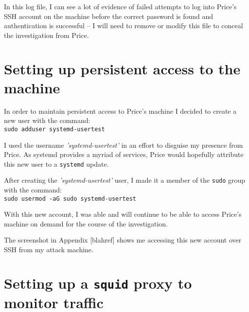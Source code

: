 \documentclass[12pt]{report}
\newcommand{\term}[1]{\colorbox{light-gray}{\texttt{#1}}}
\begin{document}
In this log file, I can see a lot of evidence of failed attempts to log into Price's SSH account on the machine before the correct password is found and authentication is successful -- I will need to remove or modify this file to conceal the investigation from Price.


\section{Setting up persistent access to the machine}
In order to maintain persistent access to Price's machine I decided to create a new user with the command:\\
\term{sudo adduser systemd-usertest}

I used the username \textit{'systemd-usertest'} in an effort to disguise my presence from Price. As systemd provides a myriad of services, Price would hopefully attribute this new user to a \texttt{systemd} update.

After creating the \textit{'systemd-usertest'} user, I made it a member of the \texttt{sudo} group with the command:\\
\term{sudo usermod -aG sudo systemd-usertest}

With this new account, I was able and will continue to be able to access Price's machine on demand for the course of the investigation.

The screenshot in Appendix [blahref] shows me accessing this new account over SSH from my attack machine.


\section{Setting up a \texttt{squid} proxy to monitor traffic}
\end{document}
